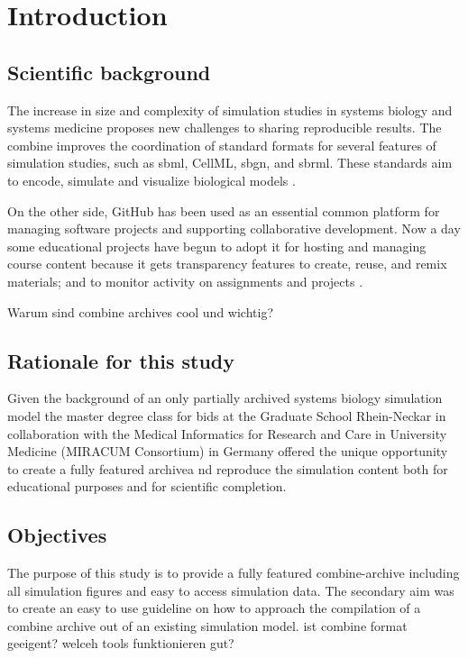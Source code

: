 \section*{Introduction}


\subsection*{Scientific background}
The increase in size and complexity of simulation studies in systems biology and systems medicine proposes new challenges to sharing reproducible results. The \ac{combine} improves the coordination of standard formats for several features of simulation studies, such as \ac{sbml}, CellML, \ac{sbgn}, and \ac{sbrml}. These standards aim to encode, simulate and visualize biological models \cite{combine}.

On the other side, GitHub has been used as an essential common platform for managing software projects and supporting collaborative development. Now a day some educational projects have begun to adopt it for hosting and managing course content because it gets transparency features to create, reuse, and remix materials; and to monitor activity on assignments and projects \cite{github}.

Warum sind combine archives cool und wichtig?


\subsection*{Rationale for this study}
Given the background of an only partially archived  systems biology simulation model the master degree class for \ac{bids} at the Graduate School Rhein-Neckar  in  collaboration  with  the  Medical  Informatics  for  Research  and  Care  in  University Medicine (MIRACUM Consortium) in Germany offered the unique opportunity to create a fully featured archivea nd reproduce the simulation content both for educational purposes and for scientific completion. 

\subsection*{Objectives}
The purpose of this study is to provide a fully featured \acs{combine}-archive including all simulation figures and easy to access simulation data. The secondary aim was to create an easy to use guideline on how to approach the compilation of a \acs{combine} archive out of an existing simulation model. ist combine format geeigent? welceh tools funktionieren gut?

